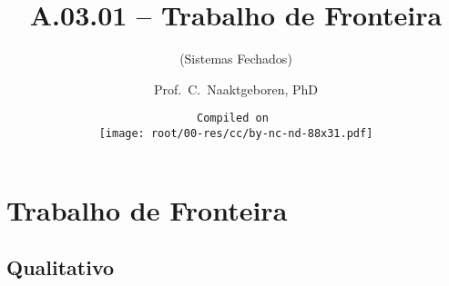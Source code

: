 \makeatletter
\immediate{} %
\makeatother


\title{A.03.01 -- Trabalho de Fronteira}
\subtitle{(Sistemas Fechados)}
\author{Prof.~C.~Naaktgeboren, PhD}
\date{%
    \texttt{Compiled on }\\[\medskipamount]
    \texttt{[image: root/00-res/cc/by-nc-nd-88x31.pdf]}
}

\logo{%
    \parbox{158mm}{%
        \texttt{[image: root/00-res/UTFPR/UTFPR-logo-A.pdf]}\hfill%
        \texttt{[image: root/00-res/logo/CNThermSci-logo-A.pdf]}%
}} %
\frame{\titlepage}
\frame{\tableofcontents}
\section{Trabalho de Fronteira}

\subsection{Qualitativo}

